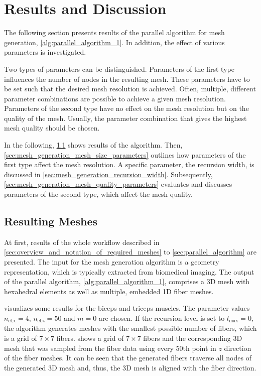 \section{Results and Discussion}

The following section presents results of the parallel algorithm for mesh generation, \cref{alg:parallel_algorithm_1}. In addition, the effect of various parameters is investigated.

Two types of parameters can be distinguished. Parameters of the first type influences the number of nodes in the resulting mesh. These parameters have to be set such that the desired mesh resolution is achieved. Often, multiple, different parameter combinations are possible to achieve a given mesh resolution.
Parameters of the second type have no effect on the mesh resolution but on the quality of the mesh. Usually, the parameter combination that gives the highest mesh quality should be chosen.

In the following, \cref{sec:mesh_generation_resulting_meshes} shows results of the algorithm. Then, \cref{sec:mesh_generation_mesh_size_parameters} outlines how parameters of the first type affect the mesh resolution. A specific parameter, the recursion width, is discussed in \cref{sec:mesh_generation_recursion_width}. Subsequently, \cref{sec:mesh_generation_mesh_quality_parameters} evaluates and discusses parameters of the second type, which affect the mesh quality.

\subsection{Resulting Meshes}\label{sec:mesh_generation_resulting_meshes}

At first, results of the whole workflow described in \cref{sec:overview_and_notation_of_required_meshes} to \cref{sec:parallel_algorithm} are presented.
The input for the mesh generation algorithm is a geometry representation, which is typically extracted from biomedical imaging. The output of the parallel algorithm, \cref{alg:parallel_algorithm_1}, comprises a 3D mesh with hexahedral elements as well as multiple, embedded 1D fiber meshes. 

 visualizes some results for the biceps and triceps muscles.
The parameter values $n_\text{el,x}=4$, $n_\text{el,z}=50$ and $m=0$ are chosen. If the recursion level is set to $l_\text{max}=0$, the algorithm generates meshes with the smallest possible number of fibers, which is a grid of $7 \times 7$ fibers.  
 shows a grid of $7\times 7$ fibers and the corresponding 3D mesh that was sampled from the fiber data using every 50th point in $z$ direction of the fiber meshes. It can be seen that the generated fibers traverse all nodes of the generated 3D mesh and, thus, the 3D mesh is aligned with the fiber direction.

